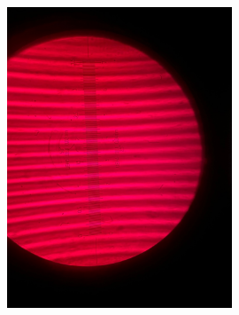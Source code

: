 \documentclass[14pt,a4paper]{article}
\begin{document}
\begin{figure}[H]
    	\centering
    	\includegraphics[width=0.6\textwidth]{Images/figure.jpg}
\end{figure}
\end{document}
